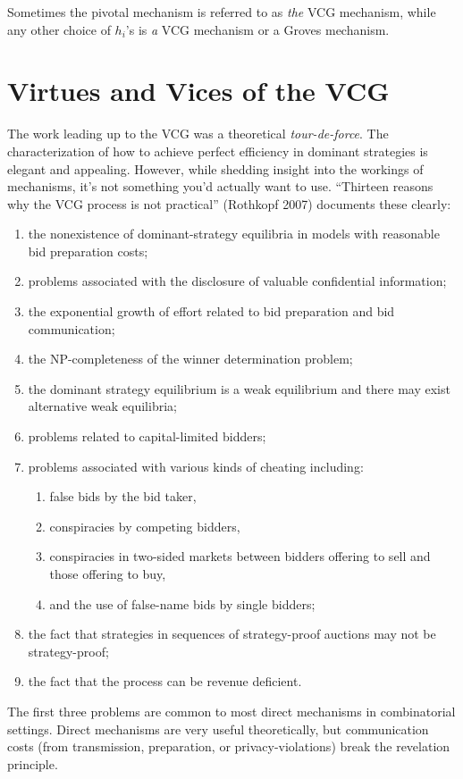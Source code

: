 \documentclass[letter, 10pt]{article}
\theoremstyle{basic}
\begin{document}
\begin{spacing}{1.0}
Sometimes the pivotal mechanism is referred to as \emph{the} VCG mechanism,
while any other choice of $h_i$'s is \emph{a} VCG mechanism or a Groves
mechanism.

\section{Virtues and Vices of the VCG}
\label{sec:virtues-vcg}

The work leading up to the VCG was a theoretical
\emph{tour-de-force}. The characterization of how to achieve
perfect efficiency in dominant strategies is elegant and
appealing. However, while shedding insight into the workings of mechanisms,
it's not something you'd actually want to use. ``Thirteen reasons why the
VCG process is not practical'' (Rothkopf 2007) documents these clearly:
\begin{enumerate}
\item the nonexistence of dominant-strategy equilibria in models with reasonable bid preparation costs;
\item problems associated with the disclosure of valuable confidential
  information;
\item the exponential growth of effort related to bid preparation and bid
  communication;
\item the NP-completeness of the winner determination problem;
\item the dominant strategy equilibrium is a weak equilibrium and there may
  exist alternative weak equilibria;
\item problems related to capital-limited bidders;
\item problems associated with various kinds of cheating
  including:
  \begin{enumerate}
  \item false bids by the bid taker,
  \item conspiracies by competing bidders,
  \item conspiracies in two-sided markets between bidders offering
    to sell and those offering to buy,
  \item  and the use of false-name bids by single bidders;
  \end{enumerate}
\item the fact that strategies in sequences of strategy-proof auctions may
  not be strategy-proof;
\item the fact that the process can be revenue deficient.
\end{enumerate}
The first three problems are common to most direct mechanisms in
combinatorial settings. Direct mechanisms are very useful theoretically,
but communication costs (from transmission, preparation, or
privacy-violations) break the revelation principle.


\end{spacing}
\end{document}
